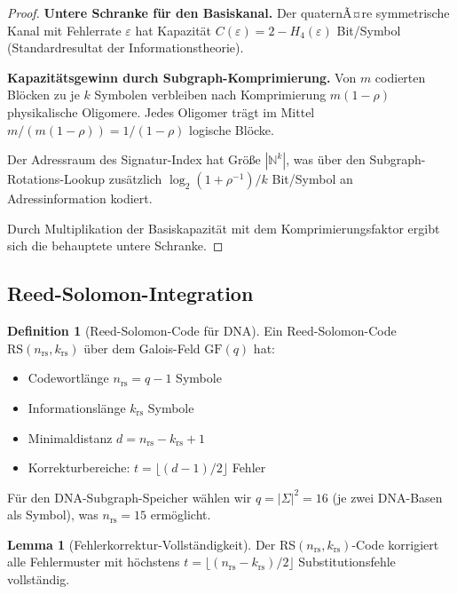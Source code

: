 ﻿\documentclass[a4paper,12pt]{article}
\theoremstyle{definition}
\newtheorem{definition}{Definition}
\newtheorem{lemma}{Lemma}
\begin{document}
\begin{proof}
    \textbf{Untere Schranke f\"{u}r den Basiskanal.}
    Der quaternÃ¤re symmetrische Kanal mit Fehlerrate $\varepsilon$ hat
    Kapazit\"{a}t $C(\varepsilon) = 2 - H_4(\varepsilon)$ Bit/Symbol
    (Standardresultat der Informationstheorie).

    \textbf{Kapazit\"{a}tsgewinn durch Subgraph-Komprimierung.}
    Von $m$ codierten Bl\"{o}cken zu je $k$ Symbolen verbleiben nach
    Komprimierung $m(1-\rho)$ physikalische Oligomere. Jedes Oligomer
    tr\"{a}gt im Mittel $m / (m(1-\rho)) = 1/(1-\rho)$ logische Bl\"{o}cke.

    Der Adressraum des Signatur-Index hat Gr\"{o}\ss{}e $|\mathbb{N}^k|$,
    was \"{u}ber den Subgraph-Rotations-Lookup zus\"{a}tzlich
    $\log_2(1 + \rho^{-1}) / k$ Bit/Symbol an Adressinformation kodiert.

    Durch Multiplikation der Basiskapazit\"{a}t mit dem Komprimierungsfaktor
    ergibt sich die behauptete untere Schranke. 
\end{proof}

\subsection{Reed-Solomon-Integration}

\begin{definition}[Reed-Solomon-Code f\"{u}r DNA]
    \label{def:reedsolomon}
    Ein Reed-Solomon-Code $\mathrm{RS}(n_{\mathrm{rs}}, k_{\mathrm{rs}})$
    \"{u}ber dem Galois-Feld $\mathrm{GF}(q)$ hat:
    \begin{itemize}
        \item Codewortl\"{a}nge $n_{\mathrm{rs}} = q - 1$ Symbole
        \item Informationsl\"{a}nge $k_{\mathrm{rs}}$ Symbole
        \item Minimaldistanz $d = n_{\mathrm{rs}} - k_{\mathrm{rs}} + 1$
        \item Korrekturbereiche: $t = \lfloor (d-1)/2 \rfloor$ Fehler
    \end{itemize}
    F\"{u}r den DNA-Subgraph-Speicher w\"{a}hlen wir $q = |\Sigma|^2 = 16$
    (je zwei DNA-Basen als Symbol), was $n_{\mathrm{rs}} = 15$ erm\"{o}glicht.
\end{definition}

\begin{lemma}[Fehlerkorrektur-Vollst\"{a}ndigkeit]
    \label{lem:ecc}
    Der RS$(n_{\mathrm{rs}}, k_{\mathrm{rs}})$-Code korrigiert alle
    Fehlermuster mit h\"{o}chstens $t = \lfloor(n_{\mathrm{rs}} -
    k_{\mathrm{rs}})/2\rfloor$ Substitutionsfehle vollst\"{a}ndig.
\end{lemma}
\end{document}

